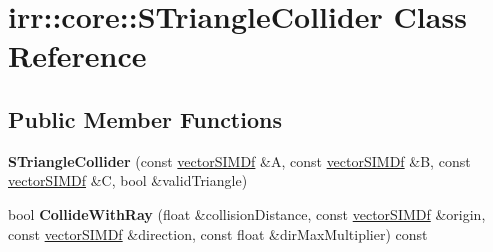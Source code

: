 \hypertarget{classirr_1_1core_1_1STriangleCollider}{}\section{irr\+:\+:core\+:\+:S\+Triangle\+Collider Class Reference}
\label{classirr_1_1core_1_1STriangleCollider}
\subsection*{Public Member Functions}
\begin{DoxyCompactItemize}
\item 
{\bfseries S\+Triangle\+Collider} (const \hyperlink{classirr_1_1core_1_1vectorSIMDf}{vector\+S\+I\+M\+Df} \&A, const \hyperlink{classirr_1_1core_1_1vectorSIMDf}{vector\+S\+I\+M\+Df} \&B, const \hyperlink{classirr_1_1core_1_1vectorSIMDf}{vector\+S\+I\+M\+Df} \&C, bool \&valid\+Triangle)\hypertarget{classirr_1_1core_1_1STriangleCollider_aee1a50870a2205dd106a2c43a4b7aac0}{}\label{classirr_1_1core_1_1STriangleCollider_aee1a50870a2205dd106a2c43a4b7aac0}

\item 
bool {\bfseries Collide\+With\+Ray} (float \&collision\+Distance, const \hyperlink{classirr_1_1core_1_1vectorSIMDf}{vector\+S\+I\+M\+Df} \&origin, const \hyperlink{classirr_1_1core_1_1vectorSIMDf}{vector\+S\+I\+M\+Df} \&direction, const float \&dir\+Max\+Multiplier) const \hypertarget{classirr_1_1core_1_1STriangleCollider_af8ba0079654d7d9af03b127a4ee551bd}{}\label{classirr_1_1core_1_1STriangleCollider_af8ba0079654d7d9af03b127a4ee551bd}

\end{DoxyCompactItemize}
